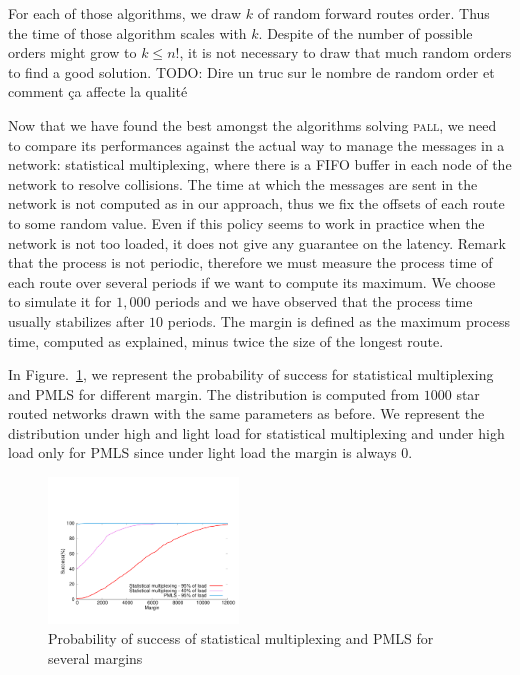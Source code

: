 \documentclass[10pt, conference, letterpaper]{IEEEtran}
\newcommand{\todo}[1]{{\color{red} TODO: {#1}}}
\newcommand\pall{\textsc{pall}\xspace}
\begin{document}
For each of those algorithms, we draw $k$ of random forward routes order. Thus the time of those algorithm scales with $k$. Despite of the number of possible orders might grow to $k \le n!$, it is not necessary to draw that much random orders to find a good solution. \cite{versionlongue}
\todo{Dire un truc sur le nombre de random order et comment ça affecte la qualité}

     Now that we have found the best amongst the algorithms solving \pall, we need to compare its performances against the actual way to manage the messages in a network:  statistical multiplexing, where there is a FIFO buffer in each node of the network to resolve collisions. The time at which the messages are sent in the network is not computed as in our approach, thus we fix the offsets of each route to some random value.
     Even if this policy seems to work in practice when the network is not too loaded, it does not give any guarantee on the latency. Remark that the process is not periodic, therefore we must measure the process time of each route over several periods if we want to compute its maximum. We choose to simulate it for $1,000$ periods and we have observed that the process time usually stabilizes after $10$ periods. The margin is defined as the maximum process time, computed as explained, minus twice the size of the longest route. 
	    
     In Figure.~\ref{fig:sto}, we represent the probability of success for 
     statistical multiplexing and PMLS for different margin. The distribution is computed from $1000$ star routed networks drawn with the same parameters as before. We represent the distribution under high and light load for statistical multiplexing and under high load only for PMLS since under light load the margin is always $0$. 
     

    \begin{figure}
       \begin{center}
      \includegraphics[width = 0.45\textwidth]{stochastic.pdf}
      \end{center}
      \caption{Probability of success of statistical multiplexing and PMLS for several margins}
      \label{fig:sto}   
     \end{figure}    
     
\end{document}
